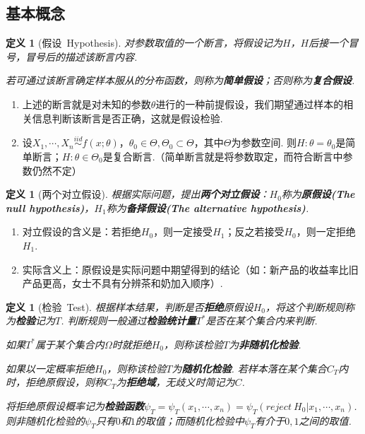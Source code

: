 \documentclass[12pt, a4paper, oneside]{ctexart}
\newtheorem{definition}[theorem]{定义}
\numberwithin{equation}{section}  %
\newenvironment{remark}{\begin{enumerate}[label=\textbf{注\arabic*.}]}{\end{enumerate}}
\begin{document}
\subsection{基本概念}
\begin{definition}[假设\ Hypothesis]
    对参数取值的一个断言，将假设记为$H$，$H$后接一个冒号，冒号后的描述该断言内容.
    
    若可通过该断言确定样本服从的分布函数，则称为\textbf{简单假设}；否则称为\textbf{复合假设}.
\end{definition}
\begin{remark}
    \item 上述的断言就是对未知的参数$\theta$进行的一种前提假设，我们期望通过样本的相关信息判断该断言是否正确，这就是假设检验.
    \item 设$X_1,\cdots, X_n\overset{iid}{\sim} f(x;\theta)$，$\theta_0\in \Theta,\Theta_0\subset \Theta$，其中$\Theta$为参数空间. 则$H:\theta=\theta_0$是简单断言；$H:\theta\in \Theta_0$是复合断言.（简单断言就是将参数取定，而符合断言中参数仍然不定）
\end{remark}
\begin{definition}[两个对立假设]
    根据实际问题，提出\textbf{两个对立假设}：$H_0$称为\textbf{原假设(The null hypothesis)}，$H_1$称为\textbf{备择假设(The alternative hypothesis)}.
\end{definition}
\begin{remark}
    \item 对立假设的含义是：若拒绝$H_0$，则一定接受$H_1$；反之若接受$H_0$，则一定拒绝$H_1$.
    \item 实际含义上：原假设是实际问题中期望得到的结论（如：新产品的收益率比旧产品更高，女士不具有分辨茶和奶加入顺序）.
\end{remark}
\begin{definition}[检验\ Test]
    根据样本结果，判断是否\textbf{拒绝}原假设$H_0$，将这个判断规则称为\textbf{检验}记为$T$. 判断规则一般通过\textbf{检验统计量}$T^*$是否在某个集合内来判断.

    如果$T^*$属于某个集合内$\Omega$时就拒绝$H_0$，则称该检验$T$为\textbf{非随机化检验}.

    如果以一定概率拒绝$H_0$，则称该检验$T$为\textbf{随机化检验}. 若样本落在某个集合$C_T$内时，拒绝原假设，则称$C_T$为\textbf{拒绝域}，无歧义时简记为$C$.
    
    将拒绝原假设概率记为\textbf{检验函数}$\psi_T = \psi_T(x_1,\cdots,x_n)=\psi_T(reject\ H_0|x_1,\cdots,x_n)$. 则非随机化检验的$\psi_T$只有$0$和$1$的取值；而随机化检验中$\psi_T$有介于$0,1$之间的取值.
\end{definition}
\end{document}
